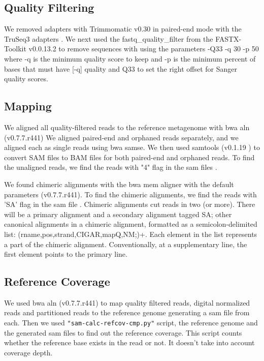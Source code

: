 \subsection*{Quality Filtering} 

We removed adapters with Trimmomatic v0.30 in paired-end mode with the
TruSeq3 adapters \cite{trim}.
We next used the fastq\_quality\_filter %
from the FASTX-Toolkit v0.0.13.2 \cite{FXtoolkit} to remove sequences with %
using the parameters -Q33 -q 30 -p 50  where -q  is the minimum quality score to keep  and -p is the minimum percent of bases that must have [-q] quality and Q33 to set the right offset for Sanger quality scores.  


\subsection*{Mapping}

We aligned all quality-filtered reads to the reference metagenome with bwa
aln (v0.7.7.r441) \cite{bwa}  %
  We aligned paired-end and orphaned reads separately,
and we aligned each as single reads using bwa samse.  We then used
samtools (v0.1.19 ) \cite{sam-stools} to convert SAM files to BAM files for both
paired-end and orphaned reads. To find the unaligned reads, we find the reads with "4" flag in the sam files \cite{sam-stools}. 

We found chimeric alignments with the bwa mem aligner with the default
parameters (v0.7.7.r441).  To find the chimeric alignments, we find the reads with 'SA' flag in the sam file \cite{sam-stools}.  
Chimeric alignments cut reads in two (or more). There will be a primary alignment and a secondary alignment tagged SA; other canonical alignments in a chimeric alignment, formatted as a semicolon-delimited list: (rname,pos,strand,CIGAR,mapQ,NM;)+. Each element in the list represents a part of the chimeric alignment. Conventionally, at a supplementary line, the first element points to the primary line.  %

\subsection*{Reference Coverage} 
We used bwa aln (v0.7.7.r441) \cite{bwa} to map quality filtered reads, digital normalized reads and
partitioned reads to the reference genome generating a sam file from
each. Then we used {\tt"sam-calc-refcov-cmp.py"} script, the reference
genome and the generated sam files to find out the reference
coverage. This script counts whether the reference base exists in the read or not. It doesn't take into account coverage depth. 


